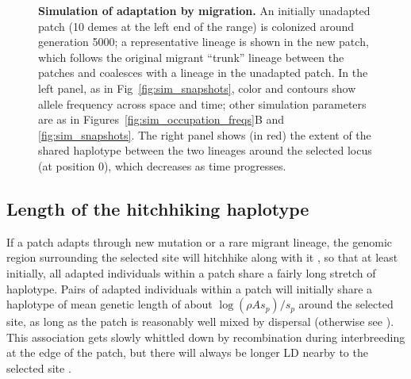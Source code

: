\documentclass[10pt,letterpaper]{article}
\newcommand{\citep}[1]{\cite{#1}}
\newcommand{\citet}[1]{\cite{#1}}
\begin{document}
\begin{figure}[ht]
  \begin{center}
  \end{center}
  \caption{
  \textbf{Simulation of adaptation by migration.}
  An initially unadapted patch (10 demes at the left end of the range) is colonized around generation 5000;
  a representative lineage is shown in the new patch, which follows the original migrant ``trunk'' lineage
  between the patches and coalesces with a lineage in the unadapted patch.
  In the left panel, as in Fig~\ref{fig:sim_snapshots}, color and contours show allele frequency across space and time;
  other simulation parameters are as in Figures~\ref{fig:sim_occupation_freqs}B and \ref{fig:sim_snapshots}.
  The right panel shows (in red) the extent of the shared haplotype between the two lineages around the selected locus (at position 0),
  which decreases as time progresses. 
  \label{fig:lineagesmotion}
  }
\end{figure}




\subsection[Haplotypes Shared Between Patches]{Length of the hitchhiking haplotype}
\label{ss:haplotype_length}


If a patch adapts through new mutation or a rare migrant lineage, the
genomic region surrounding the selected site will hitchhike along with it \citep{maynardsmith1974hitchhiking},
so that at least initially, all adapted individuals within a patch
share a fairly long stretch of haplotype. 
Pairs of adapted individuals within a patch will initially share a haplotype of mean genetic length of
about $\log(\rho A s_p)/s_p$ around the selected site, 
as long as the patch is reasonably well mixed by dispersal
(otherwise see \citet{barton2013genetic}).
This association gets slowly whittled down by recombination during interbreeding at the edge of the patch,
but there will always be longer LD nearby to the selected site \citep{barton1979geneflow}.
\end{document}
